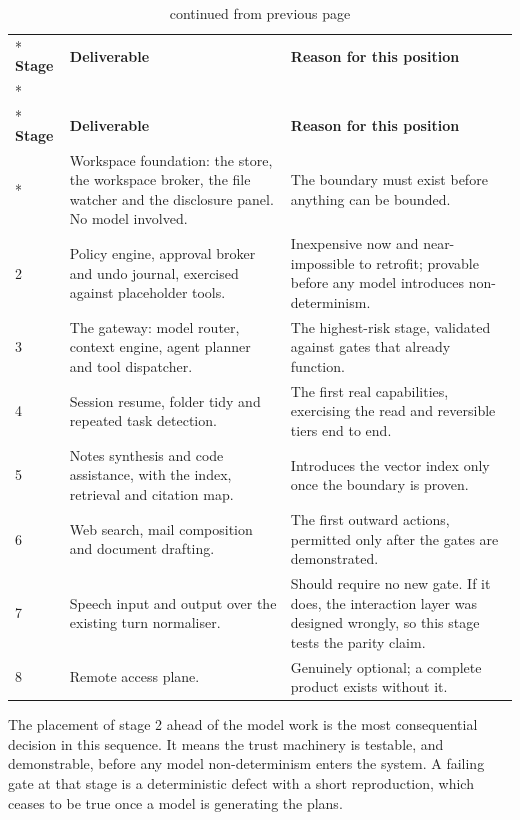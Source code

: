 \documentclass{FastFyp}
\begin{document}
{
\begin{longtable}{|p{1.2cm}|p{5.6cm}|p{6.4cm}|}
\caption{The build sequence.}\label{tab:build}\\*
\hline
\textbf{Stage} & \textbf{Deliverable} & \textbf{Reason for this position} \\*
\hline
\endfirsthead
\caption[]{continued from previous page}\\*
\hline
\textbf{Stage} & \textbf{Deliverable} & \textbf{Reason for this position} \\*
\hline
\endhead
\hline
1 & Workspace foundation: the store, the workspace broker, the file watcher and the disclosure panel. No model involved. & The boundary must exist before anything can be bounded. \\
\hline
2 & Policy engine, approval broker and undo journal, exercised against placeholder tools. & Inexpensive now and near-impossible to retrofit; provable before any model introduces non-determinism. \\
\hline
3 & The gateway: model router, context engine, agent planner and tool dispatcher. & The highest-risk stage, validated against gates that already function. \\
\hline
4 & Session resume, folder tidy and repeated task detection. & The first real capabilities, exercising the read and reversible tiers end to end. \\
\hline
5 & Notes synthesis and code assistance, with the index, retrieval and citation map. & Introduces the vector index only once the boundary is proven. \\
\hline
6 & Web search, mail composition and document drafting. & The first outward actions, permitted only after the gates are demonstrated. \\
\hline
7 & Speech input and output over the existing turn normaliser. & Should require no new gate. If it does, the interaction layer was designed wrongly, so this stage tests the parity claim. \\
\hline
8 & Remote access plane. & Genuinely optional; a complete product exists without it. \\
\hline
\end{longtable}
}

The placement of stage 2 ahead of the model work is the most consequential decision in this sequence. It means the trust machinery is testable, and demonstrable, before any model non-determinism enters the system. A failing gate at that stage is a deterministic defect with a short reproduction, which ceases to be true once a model is generating the plans.
\end{document}
